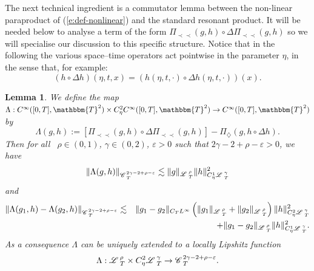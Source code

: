\documentclass[11pt,reqno]{amsart}
\newcommand{\assign}{:=}
\newcommand{\precprec}{\prec\!\!\!\prec}
\newtheorem{lemma}[theorem]{Lemma}
\newcommand{\CC}{\mathscr{C} \hspace{.1em}}
\newcommand{\LL}{\mathscr{L} \hspace{.2em}}
\begin{document}
The next technical ingredient is a commutator lemma between the non-linear
paraproduct of (\ref{e:def-nonlinear}) and the standard resonant product. It
will be needed below to analyse a term of the form $\Pi_{\precprec} (g, h)
\circ \Delta \Pi_{\precprec} (g, h)$ so we will specialise our discussion to
this specific structure. Notice that in the following the various space--time
operators act pointwise in the parameter $\eta$, in the sense that, for
example:
\[ (h \circ \Delta h) (\eta, t, x) = (h (\eta, t, \cdot) \circ \Delta h (\eta,
   t, \cdot)) (x) . \]
\begin{lemma}
  \label{l:nonlin-comm}We define the map $\Lambda : C^{\infty} ([0, T],
  \mathbbm{T}^2) \times C_{\eta}^2 C^{\infty} ([0, T], \mathbbm{T}^2)
  \rightarrow C^{\infty} ([0, T], \mathbbm{T}^2)$ by
  \[ \Lambda (g, h) \assign [\Pi_{\precprec} (g, h) \circ \Delta
     \Pi_{\precprec} (g, h)] - \Pi_{\diamondsuit} (g, h \circ \Delta h) . \]
  Then for all \ $\rho \in (0, 1)$, $\gamma \in (0, 2)$, $\varepsilon > 0$
  such that $2 \gamma - 2 + \rho - \varepsilon > 0$, we have
  \[ \| \Lambda (g, h) \|_{\CC_T^{2 \gamma - 2 + \rho - \varepsilon}}
     \lesssim \| g \|_{\LL_T^{\rho}} \| h \|_{C^1_{\eta} \LL^{\gamma}_T}^2 \]
  and
  \begin{eqnarray*}
    \| \Lambda (g_1, h) - \Lambda (g_2, h) \|_{\CC_T^{2 \gamma - 2 + \rho -
    \varepsilon}} & \lesssim & \| g_1 - g_2 \|_{C_T L^{\infty}} \left( \| g_1
    \|_{\LL^{\rho}_T} + \| g_2 \|_{\LL^{\rho}_T} \right) \| h \|^2_{C_{\eta}^2
    \LL^{\gamma}_T}\\
    &  & + \| g_1 - g_2 \|_{\LL^{\rho}_T} \| h \|^2_{C_{\eta}^1
    \LL^{\gamma}_T} .
  \end{eqnarray*}
  As a consequence $\Lambda$ can be uniquely extended to a locally Lipshitz
  function
  \[ \Lambda : \LL^{\rho}_T \times C_{\eta}^2 \LL_T^{\gamma} \rightarrow
     \CC_T^{2 \gamma - 2 + \rho - \varepsilon} . \]
\end{lemma}
\end{document}
